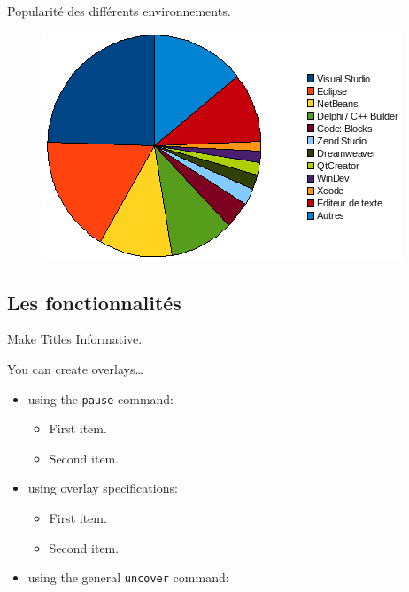 \documentclass{beamer}
\begin{document}
\begin{frame}{Popularité des différents environnements.}

\begin{figure}
\includegraphics[scale=0.80]{../images/edi.png}			
\label{fromage}				
\end{figure}

\end{frame}



\subsection{Les fonctionnalités}



\begin{frame}{Make Titles Informative.}

  You can create overlays\dots
  \begin{itemize}
  \item using the \texttt{pause} command:
    \begin{itemize}
    \item
      First item.
      \pause
    \item    
      Second item.
    \end{itemize}
  \item
    using overlay specifications:
    \begin{itemize}
    \item<3->
      First item.
    \item<4->
      Second item.
    \end{itemize}
  \item
    using the general \texttt{uncover} command:
    \begin{itemize}
    \end{itemize}
  \end{itemize}
\end{frame}
\end{document}
